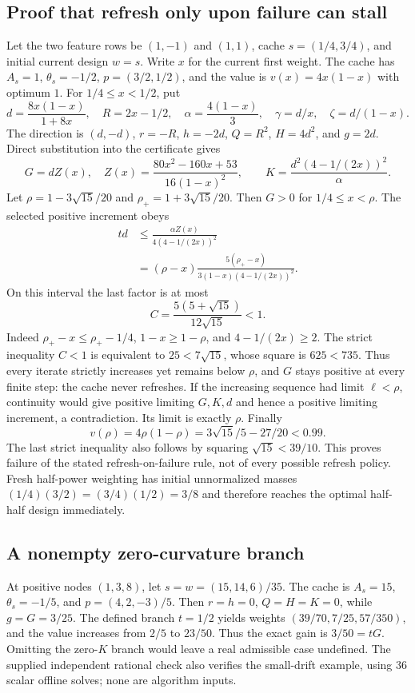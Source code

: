 \documentclass[11pt]{article}
\begin{document}
\subsection{Proof that refresh only upon failure can stall}
Let the two feature rows be $(1,-1)$ and $(1,1)$, cache $s=(1/4,3/4)$, and initial current design $w=s$. Write $x$ for the current first weight. The cache has $A_s=1$, $\theta_s=-1/2$, $p=(3/2,1/2)$, and the value is $v(x)=4x(1-x)$ with optimum $1$.
For $1/4\le x<1/2$, put
\[
 d=\frac{8x(1-x)}{1+8x},\quad R=2x-1/2,\quad
 \alpha=\frac{4(1-x)}3,\quad\gamma=d/x,\quad\zeta=d/(1-x).
\]
The direction is $(d,-d)$, $r=-R$, $h=-2d$, $Q=R^2$, $H=4d^2$, and $g=2d$. Direct substitution into the certificate gives
\[
 G=dZ(x),\quad Z(x)=\frac{80x^2-160x+53}{16(1-x)^2},\qquad
 K=\frac{d^2(4-1/(2x))^2}{\alpha}.
\]
Let $\rho=1-3\sqrt{15}/20$ and $\rho_+=1+3\sqrt{15}/20$.
Then $G>0$ for $1/4\le x<\rho$. The selected positive increment obeys
\begin{align*}
 td&\le\frac{\alpha Z(x)}{4(4-1/(2x))^2}\\
   &=(\rho-x)\frac{5(\rho_+-x)}{3(1-x)(4-1/(2x))^2}.
\end{align*}
On this interval the last factor is at most
\[
 C=\frac{5(5+\sqrt{15})}{12\sqrt{15}}<1.
\]
Indeed $\rho_+-x\le\rho_+-1/4$, $1-x\ge1-\rho$, and $4-1/(2x)\ge2$. The strict inequality $C<1$ is equivalent to $25<7\sqrt{15}$, whose square is $625<735$.
Thus every iterate strictly increases yet remains below $\rho$, and $G$ stays positive at every finite step: the cache never refreshes.
If the increasing sequence had limit $\ell<\rho$, continuity would give positive limiting $G,K,d$ and hence a positive limiting increment, a contradiction. Its limit is exactly $\rho$.
Finally
\[
 v(\rho)=4\rho(1-\rho)=3\sqrt{15}/5-27/20<0.99.
\]
The last strict inequality also follows by squaring $\sqrt{15}<39/10$.
This proves failure of the stated refresh-on-failure rule, not of every possible refresh policy.
Fresh half-power weighting has initial unnormalized masses
$(1/4)(3/2)=(3/4)(1/2)=3/8$ and therefore reaches the optimal half-half design immediately.

\subsection{A nonempty zero-curvature branch}
At positive nodes $(1,3,8)$, let $s=w=(15,14,6)/35$.
The cache is $A_s=15$, $\theta_s=-1/5$, and $p=(4,2,-3)/5$.
Then $r=h=0$, $Q=H=K=0$, while $g=G=3/25$.
The defined branch $t=1/2$ yields weights $(39/70,7/25,57/350)$, and the value increases from $2/5$ to $23/50$.
Thus the exact gain is $3/50=tG$. Omitting the zero-$K$ branch would leave a real admissible case undefined.
The supplied independent rational check also verifies the small-drift example, using 36 scalar offline solves; none are algorithm inputs.
\end{document}
